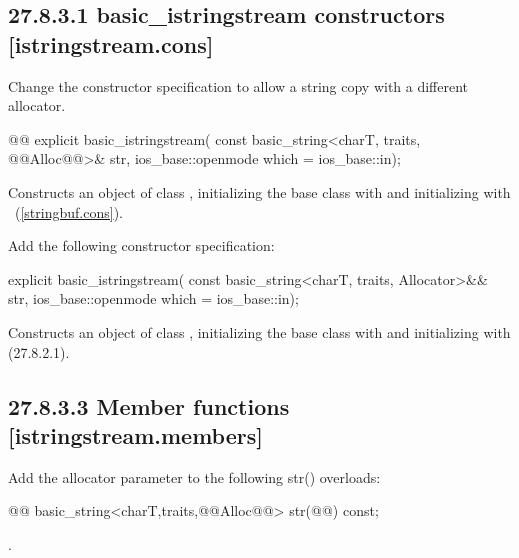 \documentclass[ebook,11pt,article]{memoir}
\begin{document}
\subsection{27.8.3.1 basic\_istringstream constructors [istringstream.cons]}
Change the constructor specification to allow a string copy with a different allocator.
\begin{itemdecl}
@@
explicit basic_istringstream(
  const basic_string<charT, traits, @@Alloc@@>& str,
  ios_base::openmode which = ios_base::in);
\end{itemdecl}

\begin{itemdescr}
\pnum
\effects
Constructs an object of class
,
initializing the base class with
and initializing  with
~(\ref{stringbuf.cons}).
\end{itemdescr}


Add the following constructor specification:

\begin{addedblock}
\begin{itemdecl}
explicit basic_istringstream(
  const basic_string<charT, traits, Allocator>&& str,
  ios_base::openmode which = ios_base::in);
\end{itemdecl}
\begin{itemdescr}
\pnum
\effects Constructs an object of class , initializing the base class with  and initializing  with  (27.8.2.1).
\end{itemdescr}
\end{addedblock}


\subsection{27.8.3.3 Member functions [istringstream.members]}
Add the allocator parameter to the following str() overloads:
\begin{itemdecl}
@@
basic_string<charT,traits,@@Alloc@@> str(@@) const;
\end{itemdecl}
\begin{itemdescr}
\pnum
\returns
{}.
\end{itemdescr}
\end{document}
